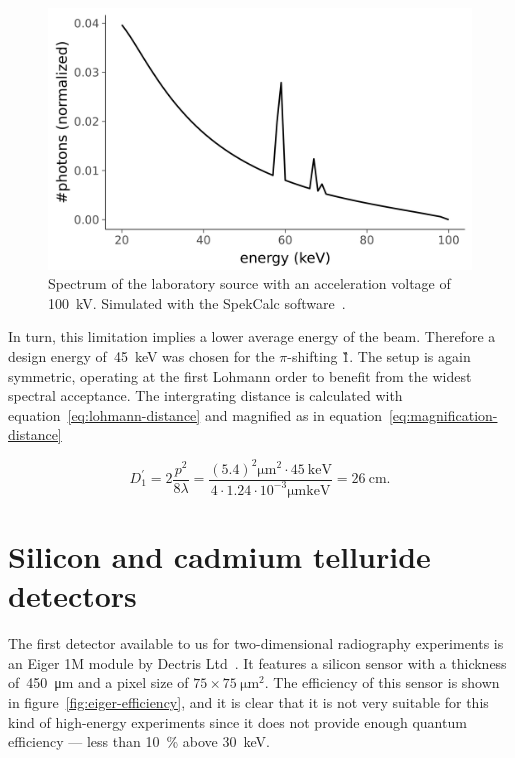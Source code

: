 \begin{figure}[htb]
    \centering
    \includegraphics[width=\textwidth]{gfx/spectrum-visibility/spectrum-100kV.png}
    \caption[Spectrum of the laboratory source at \SI{100}{\kilo\voltpeak}]{Spectrum of the laboratory source with an acceleration voltage of
        \SI{100}{\kilo\volt}. Simulated with the SpekCalc
        software~\parencite{spekcalc}.}
    \label{fig:spectrum-100kV}
\end{figure}

In turn, this limitation implies a lower average energy of the beam.
Therefore a design energy of~\SI{45}{\kilo\eV} was chosen for the
$\pi$-shifting \G1. The setup is again symmetric, operating at the first
Lohmann order to benefit from the widest spectral acceptance. The
intergrating distance is calculated with
equation~\eqref{eq:lohmann-distance} and magnified as in
equation~\eqref{eq:magnification-distance}

\begin{equation}
    D_1^\prime = 2\frac{p^2}{8\lambda} =
    \frac{(5.4)^2\si{\micro\meter\squared} \cdot \SI{45}{\kilo\eV}}{4
        \cdot 1.24 \cdot 10^{-3}\si{\micro\meter\kilo\eV}} =
        \SI{26}{\centi\meter}.
    \label{eq:intergrating-distance}
\end{equation}

\section{Silicon and cadmium telluride detectors}

The first detector available to us for two-dimensional radiography experiments is
an Eiger 1M module by Dectris Ltd~\parencite{dectris-eiger, 1748-0221-9-05-C05032}. It features a silicon sensor
with a thickness of~\SI{450}{\micro\meter} and a pixel size of
$75\times\SI{75}{\micro\meter\squared}$. The efficiency of this sensor is
shown in figure~\ref{fig:eiger-efficiency}, and it is clear that it is not
very suitable for this kind of high-energy experiments since it does not
provide enough quantum efficiency --- less than \SI{10}{\percent} above
\SI{30}{\kilo\eV}.

